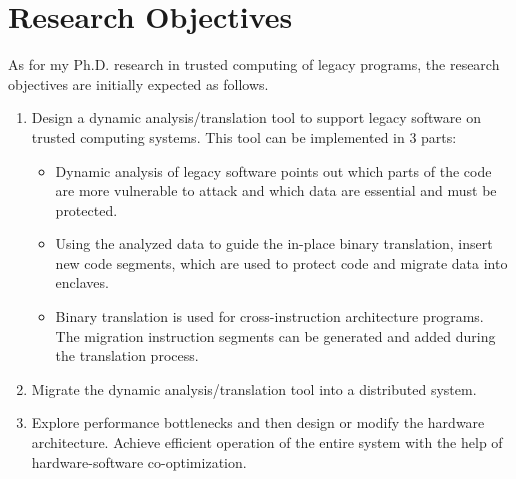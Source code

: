 \section{Research Objectives}
As for my Ph.D. research in trusted computing of legacy programs, the research
objectives are initially expected as follows.
\begin{enumerate}[(1)]
    \item Design a dynamic analysis/translation tool to support legacy
    software on trusted computing systems. This tool can be implemented
    in 3 parts:
    \begin{itemize}
        \item Dynamic analysis of legacy software points out which parts of the code are
        more vulnerable to attack and which data are essential and must be protected.
        \item Using the analyzed data to guide the in-place binary translation,
        insert new code segments, which are used to protect code and migrate data into enclaves.
        \item Binary translation is used for cross-instruction architecture programs. The migration
        instruction segments can be generated and added during the translation process.
    \end{itemize}
    \item Migrate the dynamic analysis/translation tool into a distributed system.
    \item Explore performance bottlenecks and then design or modify the hardware architecture.
    Achieve efficient operation of the entire system with the help of hardware-software
    co-optimization.
\end{enumerate}